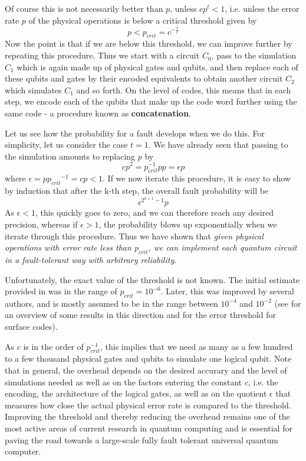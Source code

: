 \documentclass[a4paper, draft]{article}
\theoremstyle{own}
\theoremstyle{remark}
\begin{document}
Of course this is not necessarily better than $p$, unless $c p^t < 1$, i.e. unless the error rate $p$ of the physical operations is below a critical threshold given by 
$$
p < p_{crit} = c^{-\frac{1}{t}}
$$
Now the point is that if we are below this threshold, we can improve further by repeating this procedure. Thus we start with a circuit $C_0$, pass to the simulation $C_1$ which is again made up of physical gates and qubits, and then replace each of these qubits and gates by their encoded equivalents to obtain another circuit $C_2$ which simulates $C_1$ and so forth. On the level of codes, this means that in each step, we encode each of the qubits that make up the code word further using the same code - a procedure known as {\bf concatenation}.

Let us see how the probability for a fault develops when we do this. For simplicity, let us consider the case $t = 1$. We have already seen that passing to the simulation amounts to replacing $p$ by 
$$
c p^2 =  p_{crit}^{-1} p p = \epsilon p
$$
where $\epsilon = p{p_{crit}}^{-1} = cp < 1$. If we now iterate this procedure, it is easy to show by induction that after the k-th step, the overall fault probability will be
$$
\epsilon^{2^{k+1}-1} p 
$$
As $\epsilon < 1$, this quickly goes to zero, and we can therefore reach any desired precision, whereas if $\epsilon > 1$, the probability blows up exponentially when we iterate through this procedure. Thus we have shown that \emph{given physical operations with error rate less than $p_{crit}$, we can implement each quantum circuit in a fault-tolerant way with arbitrary reliability}. 

Unfortunately, the exact value of the threshold is not known. The initial estimate provided in \cite{AharonovOr} was in the range of $p_{crit} = 10^{-6}$. Later, this was improved by several authors, and is mostly assumed to be in the range between $10^{-4}$ and $10^{-2}$ (see \cite{Beginners} for an overview of some results in this direction and \cite{SurfaceCodes} for the error threshold for surface codes). 

As $c$ is in the order of $p_{crit}^{-1}$, this implies that we need as many as a few hundred to a few thousand physical gates and qubits to simulate one logical qubit. Note that in general, the overhead depends on the desired accurary and the level of simulations needed as well as on the factors entering the constant $c$, i.e. the encoding, the architecture of the logical gates, as well as on the quotient $\epsilon$ that measures how close the actual physical error rate is compared to the threshold. Improving the threshold and thereby reducing the overhead remains one of the most active areas of current research in quantum computing and is essential for paving the road towards a large-scale fully fault tolerant universal quantum computer.
\end{document}
